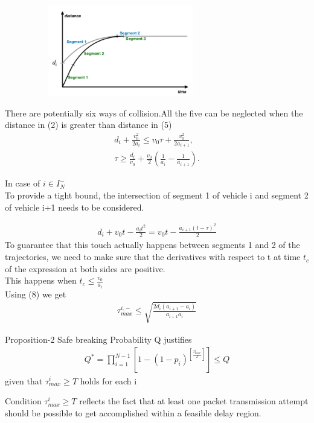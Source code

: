\documentclass{beamer}
\begin{document}
\begin{frame}
\begin{figure}[h]
    \centering
    \includegraphics[width=8cm, height=4cm]{Figure-3.png}
    \caption{}
    \label{}
\end{figure}
\begin{block}{}
  There are potentially six ways of collision.All the five can be neglected when the distance in (2) is greater than distance in (5)
    \begin{align}
        d_{i} + \frac{v_{0}^2}{2 a_{i}} \leq v_{0} \tau + \frac{v_{0}^2}{2 a_{i+1}},\\
        \tau \geq \frac{d_{i}}{v_{0}} + \frac{v_{0}}{2}(\frac{1}{a_{i}} - \frac{1}{a_{i+1}}). 
    \end{align}
\end{block}
\end{frame}
\begin{frame}
\begin{block}{In case of $i \in I_{N}^{-}$\\}
 To provide a tight bound, the intersection of segment 1 of vehicle i and segment 2 of vehicle i+1 needs to be considered.
\end{block}
\begin{align}
    d_{i} + v_{0} t - \frac{a_{i} t^2}{2} = v_{0} t - \frac{a_{i+1} (t-\tau)^2}{2}
\end{align}
To guarantee that this touch actually happens between segments 1 and 2 of the trajectories, we need to make sure that the derivatives with respect to t at time $t_{c}$ of the expression at both sides are positive.\\
This happens when $t_{c} \leq \frac{v_{0}}{a_{i}}$\\
Using (8) we get 
\begin{align}
    \tau_{max}^{i,-} \leq \sqrt{\frac{2d_{i}(a_{i+1}-a_{i})}{a_{i+1}a_{i}}}
\end{align}
\end{frame}
\begin{frame}{Proposition-2}
  Safe breaking Probability Q justifies 
  \begin{align}
      Q^{*} = \prod_{i=1}^{N-1} [1-(1-p_{i})^{[\frac{\tau_{max}^{i}}{T}]}] \leq Q 
  \end{align}
  given that $\tau_{max}^{i} \geq T$ holds for each i\\
  \begin{block}{}
    Condition $\tau_{max}^{i} \geq T$ reflects the fact that at least one packet transmission attempt should be possible to get accomplished within a
feasible delay region.
  \end{block}
\end{frame}
\end{document}
